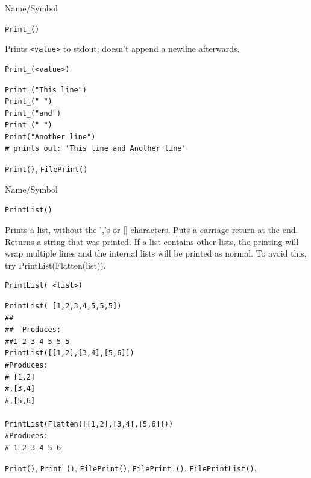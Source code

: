 \begin{desc}{Name/Symbol}
\item[Name/Symbol]	\verb+Print_()+

\item[Description]	Prints \verb+<value>+ to stdout; doesn't append a newline afterwards.

\item[Usage]		
\begin{verbatim}
Print_(<value>)
\end{verbatim}

\item[Example]	
\begin{verbatim}
Print_("This line")
Print_(" ")
Print_("and")
Print_(" ")
Print("Another line")
# prints out: 'This line and Another line'
\end{verbatim}

\item[See Also]	\verb+Print()+, \verb+FilePrint()+
\end{desc}


\begin{desc}{Name/Symbol}
\item[Name/Symbol]	\verb+PrintList()+

\item[Description]	Prints a list, without the ','s or []
  characters. Puts a carriage return at the end.  Returns a string
  that was printed.  If a list contains other lists, the printing will
  wrap multiple lines and the internal lists will be printed as
  normal.  To avoid this, try PrintList(Flatten(list)).

\item[Usage]
\begin{verbatim}
PrintList( <list>)
\end{verbatim}

\item[Example]
\begin{verbatim}
PrintList( [1,2,3,4,5,5,5])
##
##  Produces:
##1 2 3 4 5 5 5
PrintList([[1,2],[3,4],[5,6]])
#Produces:
# [1,2]
#,[3,4]
#,[5,6]

PrintList(Flatten([[1,2],[3,4],[5,6]]))
#Produces:
# 1 2 3 4 5 6

\end{verbatim}

\item[See Also]	\verb+Print()+, \verb+Print_()+, \verb+FilePrint()+, \verb+FilePrint_()+, \verb+FilePrintList()+,
\end{desc}


